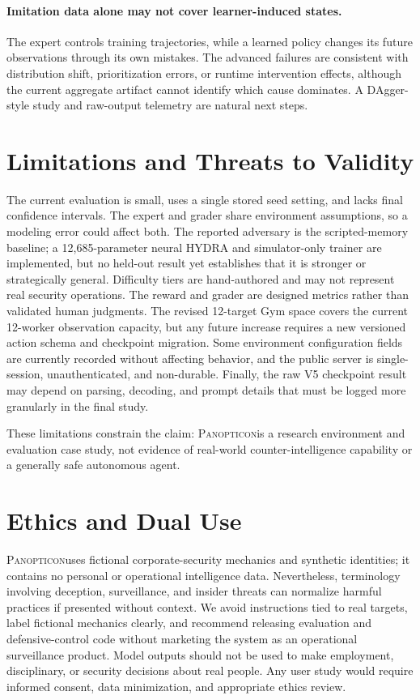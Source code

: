 \documentclass[11pt]{article}
\newcommand{\system}{\textsc{Panopticon}}
\begin{document}
\paragraph{Imitation data alone may not cover learner-induced states.}
The expert controls training trajectories, while a learned policy changes its future observations through its own mistakes. The advanced failures are consistent with distribution shift, prioritization errors, or runtime intervention effects, although the current aggregate artifact cannot identify which cause dominates. A DAgger-style study and raw-output telemetry are natural next steps.

\section{Limitations and Threats to Validity}

The current evaluation is small, uses a single stored seed setting, and lacks final confidence intervals. The expert and grader share environment assumptions, so a modeling error could affect both. The reported adversary is the scripted-memory baseline; a 12,685-parameter neural HYDRA and simulator-only trainer are implemented, but no held-out result yet establishes that it is stronger or strategically general. Difficulty tiers are hand-authored and may not represent real security operations. The reward and grader are designed metrics rather than validated human judgments. The revised 12-target Gym space covers the current 12-worker observation capacity, but any future increase requires a new versioned action schema and checkpoint migration. Some environment configuration fields are currently recorded without affecting behavior, and the public server is single-session, unauthenticated, and non-durable. Finally, the raw V5 checkpoint result may depend on parsing, decoding, and prompt details that must be logged more granularly in the final study.

These limitations constrain the claim: \system is a research environment and evaluation case study, not evidence of real-world counter-intelligence capability or a generally safe autonomous agent.

\section{Ethics and Dual Use}

\system uses fictional corporate-security mechanics and synthetic identities; it contains no personal or operational intelligence data. Nevertheless, terminology involving deception, surveillance, and insider threats can normalize harmful practices if presented without context. We avoid instructions tied to real targets, label fictional mechanics clearly, and recommend releasing evaluation and defensive-control code without marketing the system as an operational surveillance product. Model outputs should not be used to make employment, disciplinary, or security decisions about real people. Any user study would require informed consent, data minimization, and appropriate ethics review.
\end{document}
